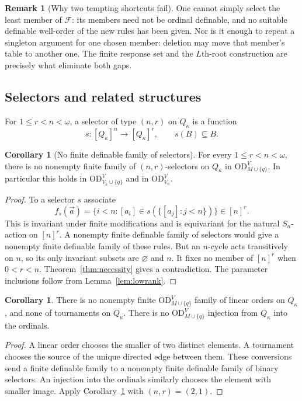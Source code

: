 \documentclass[11pt,letterpaper]{article}
\theoremstyle{definition}
\newtheorem{corollary}[definition]{Corollary}
\newtheorem{remark}[definition]{Remark}
\numberwithin{equation}{section}
\newcommand{\OD}{\mathrm{OD}}
\newcommand{\ODg}{\OD_{M\cup\{q\}}^{V}}
\newcommand{\ODlow}{\OD_{V_\kappa\cup\{q\}}^{V}}
\begin{document}
\begin{remark}[Why two tempting shortcuts fail]
One cannot simply select the least member of $\mathcal F$: its members
need not be ordinal definable, and no suitable definable well-order of the
new rules has been given. Nor is it enough to repeat a singleton argument
for one chosen member: deletion may move that member's table to another
one. The finite response set and the $L$th-root construction are precisely
what eliminate both gaps.
\end{remark}

\subsection{Selectors and related structures}

For $1\le r<n<\omega$, a selector of type $(n,r)$ on $Q_\kappa$ is a function
\[
 s:[Q_\kappa]^n\longrightarrow[Q_\kappa]^r,
 \qquad s(B)\subseteq B.
\]

\begin{corollary}[No finite definable family of selectors]\label{cor:selectors}
For every $1\le r<n<\omega$, there is no nonempty finite family of
$(n,r)$-selectors on $Q_\kappa$ in $\ODg$. In particular this holds in
$\ODlow$ and in $\OD_{V_\kappa}^V$.
\end{corollary}

\begin{proof}
To a selector $s$ associate
\[
 f_s(\vec a)=\{i<n:[a_i]\in s(\{[a_j]:j<n\})\}\in[n]^r.
\]
This is invariant under finite modifications and is equivariant for the
natural $S_n$-action on $[n]^r$. A nonempty finite definable family of
selectors would give a nonempty finite definable family of these rules.
But an $n$-cycle acts transitively on $n$, so its only invariant subsets are
$\varnothing$ and $n$. It fixes no member of $[n]^r$ when $0<r<n$.
Theorem~\ref{thm:necessity} gives a contradiction. The parameter
inclusions follow from Lemma~\ref{lem:lowrank}.
\end{proof}

\begin{corollary}\label{cor:orders}
There is no nonempty finite $\ODg$ family of linear orders on $Q_\kappa$,
and none of tournaments on $Q_\kappa$. There is no $\ODg$ injection from
$Q_\kappa$ into the ordinals.
\end{corollary}

\begin{proof}
A linear order chooses the smaller of two distinct elements. A tournament
chooses the source of the unique directed edge between them. These
conversions send a finite definable family to a nonempty finite definable
family of binary selectors. An injection into the ordinals similarly
chooses the element with smaller image. Apply
Corollary~\ref{cor:selectors} with $(n,r)=(2,1)$.
\end{proof}
\end{document}
